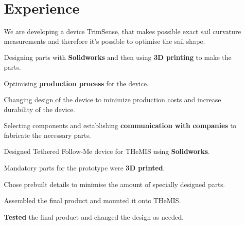 \documentclass[letterpaper]{deedy-resume} %
\begin{document}
\hfill
%
%
\begin{minipage}[t]{0.66\textwidth} %


\section{Experience}


\vspace{\topsep} %
\begin{tightitemize}
  \item We are developing a device TrimSense, that makes possible exact sail curvature measurements and therefore it's possible to optimise the sail shape.
  \item Designing parts with \textbf{Solidworks} and then using \textbf{3D printing} to make the parts.
  \item Optimising \textbf{production process} for the device.
  \item Changing design of the device to minimize production costs and increase durability of the device.
  \item Selecting components and establishing \textbf{communication with companies} to fabricate the necessary parts.
\end{tightitemize}

\sectionspace %



\begin{tightitemize}
  \item Designed Tethered Follow-Me device for THeMIS using \textbf{Solidworks}.
  \item Mandatory parts for the prototype were \textbf{3D printed}.
  \item Chose prebuilt details to minimise the amount of specially designed parts.
  \item Assembled the final product and mounted it onto THeMIS.
  \item \textbf{Tested} the final product and changed the design as needed.
\end{tightitemize}


\end{minipage}
\end{document}

